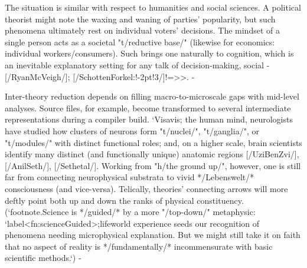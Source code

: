 The situation is similar with respect to humanities and social sciences.  
A political theorist might note the waxing and waning of parties' popularity,
but such phenomena ultimately rest on individual voters' decisions.  
The mindset of a single person acts as a societal "t/reductive base/" 
(likewise for economics: individual workers/consumers).  Such brings 
one naturally to cognition, which is an inevitable explanatory 
setting for any talk of decision-making, social -%
[/RyanMcVeigh/]; [/SchottenForkel:!-2pt!3/]!=>>.  -%

Inter-theory reduction depends on filling macro-to-microscale gaps with mid-level  
analyses.  Source files, for example,   
become transformed to several intermediate representations during a compiler build.  `Visavis; the 
human mind, neurologists have studied how clusters of neurons 
form "t/nuclei/", "t/ganglia/", or "t/modules/" with distinct functional roles; and, 
on a higher scale, brain scientists identify many distinct 
(and functionally unique) anatomic regions [/UziBenZvi/], 
[/AnilSeth/], [/Sethetal/].  Working from 
"h/the ground up/", however, one is still far from connecting 
neurophysical substrata to vivid */Lebenswelt/* 
consciousness (and vice-versa).  Telically,
theories' connecting arrows will more deftly point both up and
down the ranks of physical constituency.(`footnote.Science is */guided/* by a more   
"/top-down/" metaphysic: `label<fn:scienceGuided>;lifeworld 
experience seeds our 
recognition of phenomena needing microphysical explanation.  But we might still take it on faith that 
no aspect of reality is */fundamentally/* incommensurate 
with basic scientific methods.`) -%

